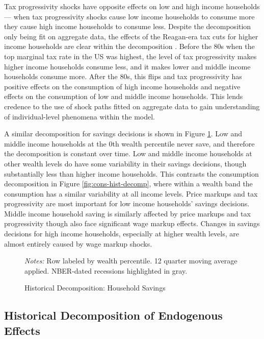 Tax progressivity shocks have opposite effects on low and high income households --- when tax progressivity shocks cause low income households to consume more they cause high income households to consume less. Despite the decomposition only being fit on aggregate data, the effects of the Reagan-era tax cuts for higher income households are clear within the decomposition \autocite{prasad2012popular}. Before the 80s when the top marginal tax rate in the US was highest, the level of tax progressivity makes higher income households consume less, and it makes lower and middle income households consume more. After the 80s, this flips and tax progressivity has positive effects on the consumption of high income households and negative effects on the consumption of low and middle income households. This lends credence to the use of shock paths fitted on aggregate data to gain understanding of individual-level phenomena within the model.

A similar decomposition for savings decisions is shown in Figure \ref{fig:sav-hist-decomp}. Low and middle income households at the 0th wealth percentile never save, and therefore the decomposition is constant over time. Low and middle income households at other wealth levels do have some variability in their savings decisions, though substantially less than higher income households. This contrasts the consumption decomposition in Figure \ref{fig:cons-hist-decomp}, where within a wealth band the consumption has a similar variability at all income levels. Price markups and tax progressivity are most important for low income households' savings decisions. Middle income household saving is similarly affected by price markups and tax progressivity though also face significant wage markup effects. Changes in savings decisions for high income households, especially at higher wealth levels, are almost entirely caused by wage markup shocks.

\begin{figure}[t!]
    \centering
    \caption{Historical Decomposition: Household Savings}
    
    {\scriptsize \emph{Notes:} Row labeled by wealth percentile. 12 quarter moving average applied. NBER-dated recessions highlighted in gray.}
    \label{fig:sav-hist-decomp}
\end{figure}


\subsection{Historical Decomposition of Endogenous Effects}

